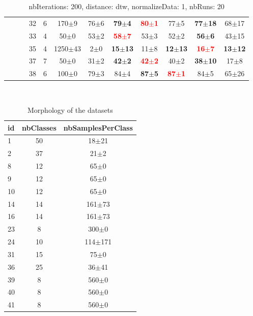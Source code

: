 \begin{table}
\begin{center}
\begin{tabular}{lllccccccccc}
 &  &  & 32 & 6 &     170$\pm$9 &  76$\pm$6 & \textbf{ 79$\pm$4} & \textbf{\textcolor{red}{ 80$\pm$1}} &  77$\pm$5 & \textbf{77$\pm$18} & 68$\pm$17 \\ 
 &  &  & 33 & 4 &      50$\pm$0 &  53$\pm$2 & \textbf{\textcolor{red}{ 58$\pm$7}} &  53$\pm$3 &  52$\pm$2 & \textbf{ 56$\pm$6} & 43$\pm$15 \\ 
 &  &  & 35 & 4 &   1250$\pm$43 &   2$\pm$0 & \textbf{15$\pm$13} &  11$\pm$8 & \textbf{12$\pm$13} & \textbf{\textcolor{red}{ 16$\pm$7}} & \textbf{13$\pm$12} \\ 
 &  &  & 37 & 7 &      50$\pm$0 &  31$\pm$2 & \textbf{ 42$\pm$2} & \textbf{\textcolor{red}{ 42$\pm$2}} &  40$\pm$2 & \textbf{38$\pm$10} &  17$\pm$8 \\ 
 &  &  & 38 & 6 &     100$\pm$0 &  79$\pm$3 &  84$\pm$4 & \textbf{ 87$\pm$5} & \textbf{\textcolor{red}{ 87$\pm$1}} &  84$\pm$5 & 65$\pm$26 \\ 
\end{tabular} 
\end{center} 
\caption{nbIterations: 200, distance: dtw, normalizeData: 1, nbRuns: 20} 
\label{nbit200DidtNoda1Nbru20} 
\end{table} 
 
  
\begin{table} 
\begin{center} 
\ 
 \setlength{\tabcolsep}{.16667em} 
\begin{tabular}{lcc} 
id & nbClasses & nbSamplesPerClass \\ 
\hline 
 1 & 50 &   18$\pm$21 \\ 
 2 & 37 &    21$\pm$2 \\ 
 8 & 12 &    65$\pm$0 \\ 
 9 & 12 &    65$\pm$0 \\ 
10 & 12 &    65$\pm$0 \\ 
14 & 14 &  161$\pm$73 \\ 
16 & 14 &  161$\pm$73 \\ 
23 &  8 &   300$\pm$0 \\ 
24 & 10 & 114$\pm$171 \\ 
31 & 15 &    75$\pm$0 \\ 
36 & 25 &   36$\pm$41 \\ 
39 &  8 &   560$\pm$0 \\ 
40 &  8 &   560$\pm$0 \\ 
41 &  8 &   560$\pm$0 \\ 
\end{tabular} 
\end{center} 
\caption{Morphology of the datasets} 
\label{didtNoda1} 
\end{table} 
 
